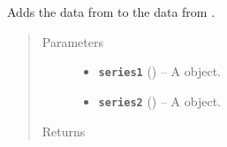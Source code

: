\documentclass[letterpaper,10pt,english]{sphinxmanual}
\begin{document}

\begin{fulllineitems}
\label{additional_functions:fredpy.plus}
Adds the data from  to the data from .
\begin{quote}\begin{description}
\item[{Parameters}] \leavevmode\begin{itemize}
\item {} 
\textbf{\texttt{series1}} ({\hyperref[series_class:fredpy.series]{}}) -- A  object.

\item {} 
\textbf{\texttt{series2}} ({\hyperref[series_class:fredpy.series]{}}) -- A  object.

\end{itemize}

\item[{Returns}] \leavevmode
{\hyperref[series_class:fredpy.series]{}}

\end{description}\end{quote}

\end{fulllineitems}

\end{document}
